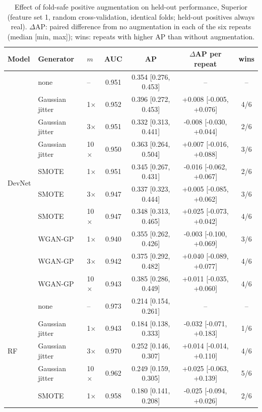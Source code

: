 \documentclass[pdflatex,sn-apa]{sn-jnl}
\begin{document}
\begin{table}[t]
\caption{Effect of fold-safe positive augmentation on held-out performance, Superior (feature set 1, random cross-validation, identical folds; held-out positives always real). $\Delta$AP: paired difference from no augmentation in each of the six repeats (median [min, max]); wins: repeats with higher AP than without augmentation.}\label{tab:augmentation}
\scriptsize
\setlength{\tabcolsep}{2.5pt}
\begin{tabular*}{\textwidth}{@{\extracolsep\fill}lllcccc}
\toprule
Model & Generator & $m$ & AUC & AP & $\Delta$AP per repeat & wins \\
\midrule
\multirow{10}{*}{DevNet} & none & -- & 0.951 & 0.354 [0.276, 0.453] & -- & -- \\
 & Gaussian jitter & 1$\times$ & 0.952 & 0.396 [0.272, 0.453] & +0.008 [-0.005, +0.076] & 4/6 \\
 & Gaussian jitter & 3$\times$ & 0.951 & 0.332 [0.313, 0.441] & -0.008 [-0.030, +0.044] & 2/6 \\
 & Gaussian jitter & 10$\times$ & 0.950 & 0.363 [0.264, 0.504] & +0.007 [-0.016, +0.088] & 3/6 \\
 & SMOTE & 1$\times$ & 0.951 & 0.345 [0.267, 0.431] & -0.016 [-0.062, +0.067] & 2/6 \\
 & SMOTE & 3$\times$ & 0.947 & 0.337 [0.323, 0.444] & +0.005 [-0.085, +0.062] & 3/6 \\
 & SMOTE & 10$\times$ & 0.947 & 0.348 [0.313, 0.465] & +0.025 [-0.073, +0.042] & 4/6 \\
 & WGAN-GP & 1$\times$ & 0.940 & 0.355 [0.262, 0.426] & -0.003 [-0.100, +0.069] & 3/6 \\
 & WGAN-GP & 3$\times$ & 0.942 & 0.375 [0.292, 0.482] & +0.040 [-0.089, +0.077] & 4/6 \\
 & WGAN-GP & 10$\times$ & 0.943 & 0.385 [0.286, 0.449] & +0.011 [-0.035, +0.060] & 4/6 \\
\midrule
\multirow{10}{*}{RF} & none & -- & 0.973 & 0.214 [0.154, 0.261] & -- & -- \\
 & Gaussian jitter & 1$\times$ & 0.943 & 0.184 [0.138, 0.333] & -0.032 [-0.071, +0.183] & 1/6 \\
 & Gaussian jitter & 3$\times$ & 0.970 & 0.252 [0.146, 0.307] & +0.014 [-0.014, +0.110] & 4/6 \\
 & Gaussian jitter & 10$\times$ & 0.962 & 0.249 [0.159, 0.305] & +0.025 [-0.063, +0.139] & 5/6 \\
 & SMOTE & 1$\times$ & 0.958 & 0.180 [0.141, 0.208] & -0.025 [-0.094, +0.026] & 2/6 \\

\end{tabular*}
\end{table}
\end{document}
